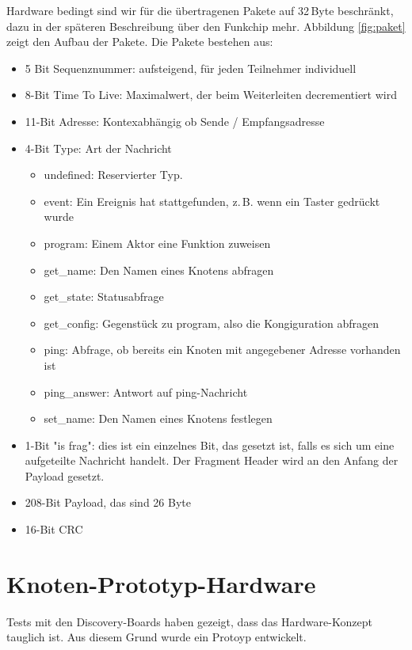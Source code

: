 \documentclass{IEEEtran}
\begin{document}
        Hardware bedingt sind wir für die übertragenen Pakete auf 32\,Byte 
        beschränkt, dazu in der späteren Beschreibung über den Funkchip mehr. 
        Abbildung \ref{fig:paket} zeigt den Aufbau der Pakete. Die Pakete 
        bestehen aus:
        \begin{itemize}
            \item 5 Bit Sequenznummer: aufsteigend, für jeden Teilnehmer individuell
            \item 8-Bit Time To Live: Maximalwert, der beim Weiterleiten decrementiert wird
            \item 11-Bit Adresse: Kontexabhängig ob Sende / Empfangsadresse
            \item 4-Bit Type: Art der Nachricht
            \begin{itemize}
                \item undefined: Reservierter Typ.
                \item event: Ein Ereignis hat stattgefunden, z.\,B. wenn ein Taster gedrückt wurde
                \item program: Einem Aktor eine Funktion zuweisen
                \item get\_name: Den Namen eines Knotens abfragen
                \item get\_state: Statusabfrage
                \item get\_config: Gegenstück zu program, also die Kongiguration abfragen
                \item ping: Abfrage, ob bereits ein Knoten mit angegebener Adresse vorhanden ist
                \item ping\_answer: Antwort auf ping-Nachricht
                \item set\_name: Den Namen eines Knotens festlegen
            \end{itemize}
            \item 1-Bit "is frag": dies ist ein einzelnes Bit, das gesetzt ist, falls es sich um eine aufgeteilte Nachricht handelt. Der Fragment Header wird an den Anfang der Payload gesetzt.
            \item 208-Bit Payload, das sind 26 Byte
            \item 16-Bit CRC
        \end{itemize}

\section{Knoten-Prototyp-Hardware}
Tests mit den Discovery-Boards haben gezeigt, dass das Hardware-Konzept tauglich ist.
Aus diesem Grund wurde ein Protoyp entwickelt. 
\end{document}
